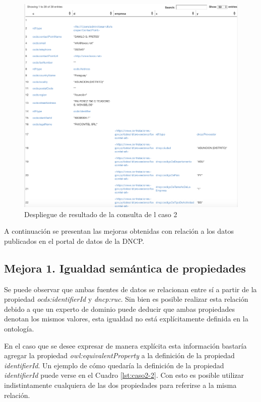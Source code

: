  \begin{figure}[ht!]
    \centering
    \includegraphics[width=150mm]{figuras/caso2Resultado.png}
    \caption{Despliegue de resultado de la consulta de l caso 2}
    \label{img:caso2Resultado}
 \end{figure}



A continuación se presentan las mejoras obtenidas con relación a los datos publicados en el portal de datos de la DNCP.
 
 \subsection{Mejora 1. Igualdad semántica de propiedades}
 Se puede observar que ambas fuentes de datos se relacionan entre sí a partir de la propiedad \textit{ocds:identifierId} y \textit{dncp:ruc}. Sin bien es posible realizar esta relación debido a que un experto de dominio puede deducir que ambas propiedades denotan los mismos valores, esta igualdad no está explícitamente definida en la ontología. 
 
 En el caso que se desee expresar de manera explícita esta información bastaría agregar la propiedad \textit{owl:equivalentProperty}  a la definición de la propiedad \textit{identifierId}. Un ejemplo de cómo quedaría la definición de la propiedad \textit{identifierId} puede verse en el Cuadro \ref{lst:caso2-2}. Con esto es posible utilizar indistintamente cualquiera de las dos propiedades para referirse a la misma relación.\hfill \break

